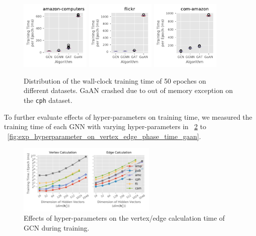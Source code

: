 \begin{figure}[htb]
    \includegraphics[width=0.3\textwidth]{figs/experiments/exp_absolute_training_time_comparison_amazon-computers.pdf}
    \includegraphics[width=0.3\textwidth]{figs/experiments/exp_absolute_training_time_comparison_flickr.pdf}
    \includegraphics[width=0.3\textwidth]{figs/experiments/exp_absolute_training_time_comparison_com-amazon.pdf}
    \caption{Distribution of the wall-clock training time of 50 epoches on different datasets. GaAN crashed due to out of memory exception on the \texttt{cph} dataset.}
    \label{fig:exp_absolute_training_time}
\end{figure}

To further evaluate effects of hyper-parameters on training time, we measured the training time of each GNN with varying hyper-parameters in \figurename~\ref{fig:exp_hyperparameter_on_vertex_edge_phase_time_gcn} to \figurename~\ref{fig:exp_hyperparameter_on_vertex_edge_phase_time_gaan}.

\begin{figure}[H]
    \centering
    \includegraphics[width=0.6\textwidth]{figs/experiments/exp_hyperparameter_on_vertex_edge_phase_time_gcn.pdf}
    \caption{Effects of hyper-parameters on the vertex/edge calculation time of GCN during training.}
    \label{fig:exp_hyperparameter_on_vertex_edge_phase_time_gcn}
\end{figure}

